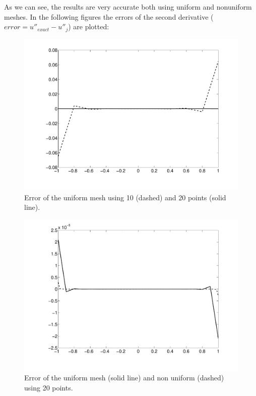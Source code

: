 As we can see, the results are very accurate both using uniform and nonuniform
meshes. In the following figures the errors of the second derivative ($error=
u''_{exact}-u''_j$) are plotted:

\begin{multicols}{2}

\begin{figure}[H]
\centering
\includegraphics[scale=0.3, trim = 20mm 0mm 0mm 0mm, clip]
{./Figures/1-HOFD/error1.pdf}  \caption{Error of the uniform mesh using 10
(dashed) and 20 points (solid line).}
\end{figure}



\columnbreak

\begin{figure}[H]
\centering
\includegraphics[scale=0.3, trim = 20mm 0mm 0mm 0mm, clip]{./Figures/1-HOFD/error2.pdf}
\caption{Error of the uniform mesh (solid line) and non uniform (dashed) using
20 points.}
\end{figure}

\end{multicols}

